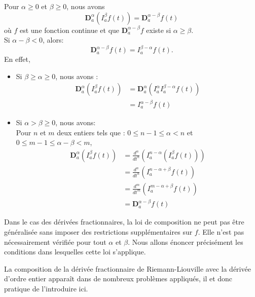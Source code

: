 Pour $\alpha \geq 0$ et $\beta \geq 0$, nous avons
\begin{equation*}
    \textbf{D}_a^{\alpha}\left(I_a^{\beta} f(t)\right) = \textbf{D}_a^{\alpha - \beta} f(t)
\end{equation*}
où $f$ est une fonction continue et que $\textbf{D}_a^{\alpha-\beta}f$ existe si $\alpha \geq \beta$.\\
Si $\alpha - \beta<0$, alors:
\begin{equation}
    \textbf{D}_a^{\alpha - \beta} f(t) = I_a^{\beta-\alpha}f(t).
\end{equation}
En effet,
\begin{itemize}
    \item Si $\beta \geq \alpha \geq 0$, nous avons :
    \begin{align*}
        \textbf{D}_a^{\alpha}\left(I_a^{\beta} f(t)\right) &= \textbf{D}_a^{\alpha}\left(I_a^{\alpha} I_a^{\beta-\alpha} f(t)\right)\\
        &= I_a^{\alpha - \beta} f(t)
    \end{align*}
    \item Si $\alpha>\beta\geq0$, nous avons:\\
    Pour $n$ et $m$ deux entiers tels que : $0\leq n-1 \leq \alpha < n$ et $0\leq m-1\leq\alpha - \beta<m$,
    \begin{align*}
        \textbf{D}_a^{\alpha}\left(I_a^{\beta} f(t)\right) &= \frac{d^n}{dt^n}\left(I_a^{n-\alpha}\left(I_a^{\beta} f(t)\right)\right)\\
        &= \frac{d^n}{dt^n}\left(I_a^{n-\alpha+\beta} f(t)\right)\\
        &= \frac{d^m}{dt^m}\left(I_a^{m-\alpha+\beta} f(t)\right)\\
        &= \textbf{D}_a^{\alpha - \beta} f(t)
    \end{align*}
\end{itemize}
\begin{remarque}
    Dans le cas des dérivées fractionnaires, la loi de composition ne peut pas être généralisée sans imposer des restrictions supplémentaires sur $f$. Elle n'est pas nécessairement vérifiée pour tout $\alpha$ et $\beta$. Nous allons énoncer précisément les conditions dans lesquelles cette loi s'applique.
\end{remarque}
La composition de la dérivée fractionnaire de Riemann-Liouville avec la dérivée d'ordre entier apparaît dans de nombreux problèmes appliqués, il et donc pratique de l'introduire ici.\\
